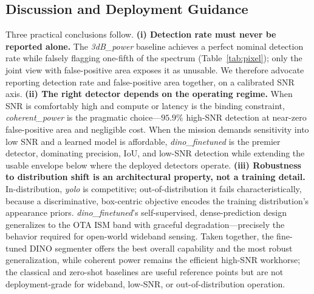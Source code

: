 \subsection{Discussion and Deployment Guidance}
\label{sec:eval:takeaways}

Three practical conclusions follow. \textbf{(i) Detection rate must never be reported
alone.} The \emph{3dB\_power} baseline achieves a perfect nominal detection rate while
falsely flagging one-fifth of the spectrum (Table~\ref{tab:pixel}); only the joint
view with false-positive area exposes it as unusable. We therefore advocate reporting
detection rate and false-positive area together, on a calibrated SNR axis.
\textbf{(ii) The right detector depends on the operating regime.} When SNR is
comfortably high and compute or latency is the binding constraint,
\emph{coherent\_power} is the pragmatic choice---$95.9\%$ high-SNR detection at
near-zero false-positive area and negligible cost. When the mission demands sensitivity
into low SNR and a learned model is affordable, \emph{dino\_finetuned} is the premier
detector, dominating precision, IoU, and low-SNR detection while extending the usable
envelope below where the deployed detectors operate. \textbf{(iii) Robustness to
distribution shift is an architectural property, not a training detail.} In-distribution,
\emph{yolo} is competitive; out-of-distribution it fails characteristically, because a
discriminative, box-centric objective encodes the training distribution's appearance
priors. \emph{dino\_finetuned}'s self-supervised, dense-prediction design generalizes to
the OTA ISM band with graceful degradation---precisely the behavior required for
open-world wideband sensing. Taken together, the fine-tuned DINO segmenter offers the
best overall capability and the most robust generalization, while coherent power remains
the efficient high-SNR workhorse; the classical and zero-shot baselines are useful
reference points but are not deployment-grade for wideband, low-SNR, or out-of-distribution
operation.

